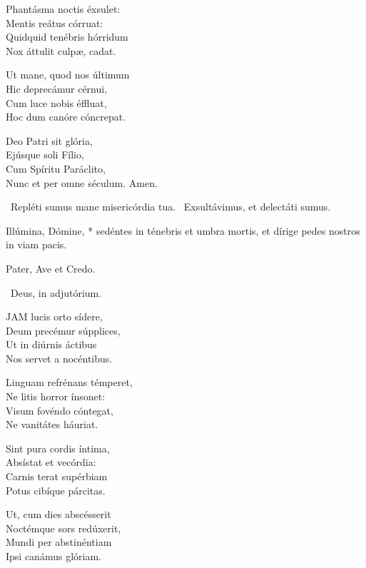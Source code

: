 Phantásma noctis éxsulet:\\
Mentis reátus córruat:\\
Quidquid tenébris hórridum\\
Nox áttulit culpæ, cadat.

Ut mane, quod nos últimum\\
Hic deprecámur cérnui,\\
Cum luce nobis éffluat,\\
Hoc dum canóre cóncrepat.

Deo Patri sit glória,\\
Ejúsque soli Fílio,\\
Cum Spíritu Paráclito,\\
Nunc et per omne séculum. Amen.

\V\ Repléti sumus mane misericórdia tua. \R\ Exsultávimus, et delectáti sumus.


 Illúmina, Dómine, * sedéntes in ténebris et umbra mortis, et dírige pedes nostros in viam pacis.



\sectionornament


Pater, Ave et Credo.

\V\ Deus, in adjutórium.


\lettrine[lines=2]{J}{AM} lucis orto sídere,\\
Deum precémur súpplices,\\
Ut in diúrnis áctibus\\
Nos servet a nocéntibus.

Linguam refrénans témperet,\\
Ne litis horror ínsonet:\\
Visum fovéndo cóntegat,\\
Ne vanitátes háuriat.

Sint pura cordis íntima,\\
Absístat et vecórdia:\\
Carnis terat supérbiam\\
Potus cibíque párcitas.

Ut, cum dies abscésserit\\
Noctémque sors redúxerit,\\
Mundi per abstinéntiam\\
Ipsi canámus glóriam.

